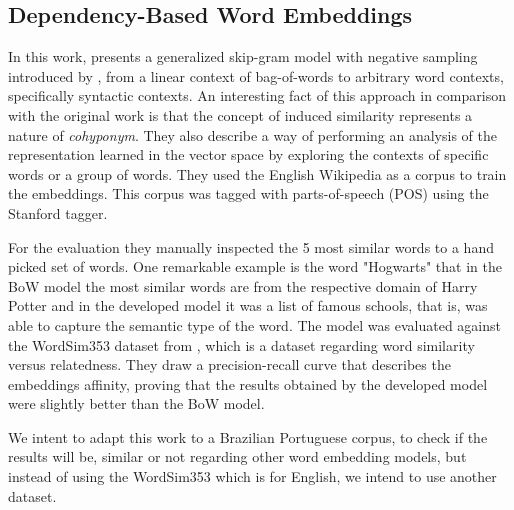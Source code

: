\subsection{Dependency-Based Word Embeddings}
In this work,  presents a generalized skip-gram model with negative sampling introduced by , from a linear context of bag-of-words to arbitrary word contexts, specifically syntactic contexts. An interesting fact of this approach in comparison with the original work is that the concept of induced similarity represents a nature of \textit{cohyponym}. They also describe a way of performing an analysis of the representation learned in the vector space by exploring the contexts of specific words or a group of words.
They used the English Wikipedia as a corpus to train the embeddings. This corpus was tagged with parts-of-speech (POS) using the Stanford tagger. 

For the evaluation they manually inspected the 5 most similar words to a hand picked set of words. One remarkable example is the word "Hogwarts" that in the BoW model the most similar words are from the respective domain of Harry Potter and in the developed model it was a list of famous schools, that is, was able to capture the semantic type of the word.
The model was evaluated against the WordSim353 dataset from , which is a dataset regarding word similarity versus relatedness. They draw a precision-recall curve that describes the embeddings affinity, proving that the results obtained by the developed model were slightly better than the BoW model.

We intent to adapt this work to a Brazilian Portuguese corpus, to check if the results will be, similar or not regarding other word embedding models, but instead of using the WordSim353 which is for English, we intend to use another dataset.
